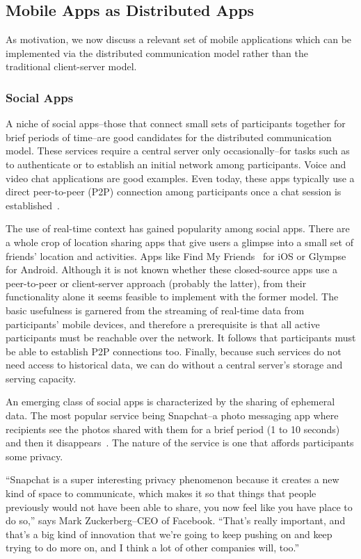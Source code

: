 \documentclass[prodmode]{acmlarge}
\begin{document}
\subsection{Mobile Apps as Distributed Apps}
As motivation, we now discuss a relevant set of mobile applications which can be implemented via the distributed communication model rather than the traditional client-server model.

\subsubsection{Social Apps}
A niche of social apps--those that connect small sets of participants together for brief periods of time--are good candidates for the distributed communication model. These services require a central server only occasionally--for tasks such as to authenticate or to establish an initial network among participants. Voice and video chat applications are good examples. Even today, these apps typically use a direct peer-to-peer (P2P) connection among participants once a chat session is established~\cite{SkypeStudy,GoogleTalkLibrary}.

The use of real-time context has gained popularity among social apps. There are a whole crop of location sharing apps that give users a glimpse into a small set of friends' location and activities. Apps like Find My Friends~\cite{FindMyFriends} for iOS or Glympse~\cite{Glympse} for Android. Although it is not known whether these closed-source apps use a peer-to-peer or client-server approach (probably the latter), from their functionality alone it seems feasible to implement with the former model. The basic usefulness is garnered from the streaming of real-time data from participants' mobile devices, and therefore a prerequisite is that all active participants must be reachable over the network. It follows that participants must be able to establish P2P connections too. Finally, because such services do not need access to historical data, we can do without a central server's storage and serving capacity.

An emerging class of social apps is characterized by the sharing of ephemeral data. The most popular service being Snapchat--a photo messaging app where recipients see the photos shared with them for a brief period (1 to 10 seconds) and then it disappears~\cite{Snapchat}. The nature of the service is one that affords participants some privacy.

``Snapchat is a super interesting privacy phenomenon because it creates a new kind of space to communicate, which makes it so that things that people previously would not have been able to share, you now feel like you have place to do so,'' says Mark Zuckerberg--CEO of Facebook. ``That's really important, and that's a big kind of innovation that we're going to keep pushing on and keep trying to do more on, and I think a lot of other companies will, too.''~\cite{Zuckerberg}
\end{document}
